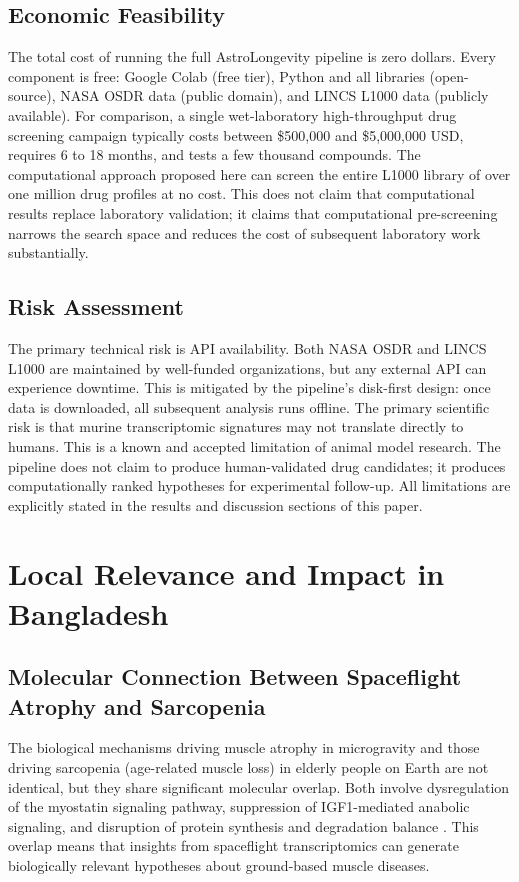 \documentclass[conference]{IEEEtran}
\begin{document}
\subsection{Economic Feasibility}
The total cost of running the full AstroLongevity pipeline is zero dollars. Every component is free: Google Colab (free tier), Python and all libraries (open-source), NASA OSDR data (public domain), and LINCS L1000 data (publicly available). For comparison, a single wet-laboratory high-throughput drug screening campaign typically costs between \$500,000 and \$5,000,000 USD, requires 6 to 18 months, and tests a few thousand compounds. The computational approach proposed here can screen the entire L1000 library of over one million drug profiles at no cost. This does not claim that computational results replace laboratory validation; it claims that computational pre-screening narrows the search space and reduces the cost of subsequent laboratory work substantially.

\subsection{Risk Assessment}
The primary technical risk is API availability. Both NASA OSDR and LINCS L1000 are maintained by well-funded organizations, but any external API can experience downtime. This is mitigated by the pipeline's disk-first design: once data is downloaded, all subsequent analysis runs offline. The primary scientific risk is that murine transcriptomic signatures may not translate directly to humans. This is a known and accepted limitation of animal model research. The pipeline does not claim to produce human-validated drug candidates; it produces computationally ranked hypotheses for experimental follow-up. All limitations are explicitly stated in the results and discussion sections of this paper.

\section{Local Relevance and Impact in Bangladesh}

\subsection{Molecular Connection Between Spaceflight Atrophy and Sarcopenia}
The biological mechanisms driving muscle atrophy in microgravity and those driving sarcopenia (age-related muscle loss) in elderly people on Earth are not identical, but they share significant molecular overlap. Both involve dysregulation of the myostatin signaling pathway, suppression of IGF1-mediated anabolic signaling, and disruption of protein synthesis and degradation balance \cite{lee2020}. This overlap means that insights from spaceflight transcriptomics can generate biologically relevant hypotheses about ground-based muscle diseases.
\end{document}
